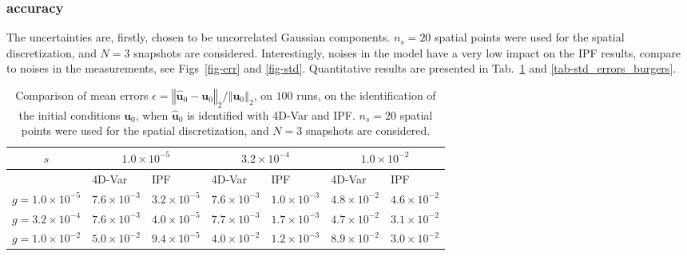 \documentclass[10pt,openany,onecolumn,a4wide,pof]{article}
\newcommand{\gras}[1]{\boldsymbol{#1}}
\newcommand{\norme}[1]{\left\Vert #1\right\Vert_2}
\newcommand{\Nsnap}{N} %
\newcommand{\Ns}{n_s} %
\newcommand{\point}{\gras{u}} %
\newcommand{\error}{\epsilon} %
\begin{document}
\subsubsection{accuracy}
The uncertainties are, firstly, chosen to be uncorrelated Gaussian components. $\Ns=20$ spatial points were used for the spatial discretization, and $\Nsnap = 3$ snapshots are considered. 
Interestingly, noises in the model have a very low impact on the IPF results, compare to noises in the measurements, see Figs~\ref{fig-err} and \ref{fig-std}. Quantitative results are presented in Tab.~\ref{tab-mean_errors_burgers} and \ref{tab-std_errors_burgers}.

\begin{table}[h!]
\caption{
Comparison of mean errors $\error = \norme{\hat{\point}_0-\point_0}/\norme{\point_0}$, on $100$ runs, on the identification of the initial conditions $\point_0$, when $\hat{\point}_0$ is identified with 4D-Var and IPF. $\Ns=20$ spatial points were used for the spatial discretization, and $\Nsnap = 3$ snapshots are considered.
}
\begin{centering}
\begin{tabular}{c|ll|ll|ll}
$s$  & \multicolumn{2}{|c}{ $ 1.0\times 10^{-5} $ } & \multicolumn{2}{|c}{ $ 3.2\times 10^{-4} $ } & \multicolumn{2}{|c}{ $ 1.0\times 10^{-2} $ }  \\ 
\hline 
  & {\scriptsize 4D-Var} & {\scriptsize IPF} & {\scriptsize 4D-Var} & {\scriptsize IPF} & {\scriptsize 4D-Var} & {\scriptsize IPF} \\ 
\hline 
$ g=      1.0\times 10^{-5}$ & $7.6\times 10^{-3}$ & $3.2\times 10^{-5}$ & $7.6\times 10^{-3}$ & $1.0\times 10^{-3}$ & $4.8\times 10^{-2}$ & $4.6\times 10^{-2}$ \\ 
$g=      3.2\times 10^{-4} $ & $7.6\times 10^{-3}$ & $4.0\times 10^{-5}$ & $7.7\times 10^{-3}$ & $1.7\times 10^{-3}$ & $4.7\times 10^{-2}$ & $3.1\times 10^{-2}$ \\ 
$ g=      1.0\times 10^{-2}$ & $ 5.0\times 10^{-2}$ & $9.4\times 10^{-5}$ & $4.0\times 10^{-2}$ & $1.2\times 10^{-3}$ & $8.9\times 10^{-2}$ & $3.0\times 10^{-2}$ \\ 
\end{tabular}
\label{tab-mean_errors_burgers}
\end{centering}
\end{table}
\end{document}

